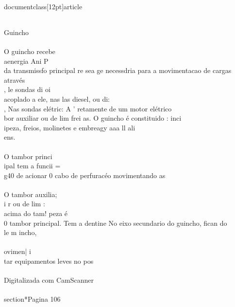 \\documentclass[12pt]{article}
\begin{document}
\\
Guincho\\
\\
O guincho recebe\\
aenergia Ani P\\
da transmissfo principal re sea ge necessdria para a movimentacao de cargas através\\
, le sondas di oi\\
acoplado a ele, nas las diesel, ou di:\\
, Nas sondas elétric: A ’ retamente de um motor elétrico\\
bor auxiliar ou de lim frei as. O guincho é constituido : inci\\
ipeza, freios, molinetes e embreagy aaa ll ali\\
ens.\\
\\
O tambor princi\\
ipal tem a funcii =\\
g40 de acionar 0 cabo de perfuracéo movimentando as\\
\\
O tambor auxilia;\\
i r ou de lim :\\
acima do tam! peza é\\
0 tambor principal. Tem a dentine No eixo secundario do guincho, fican do\\
le m incho,\\
\\
ovimen| i\\
tar equipamentos leves no pos\\
\\
Digitalizada com CamScanner\\

\\section*{Pagina 106}
\end{document}

